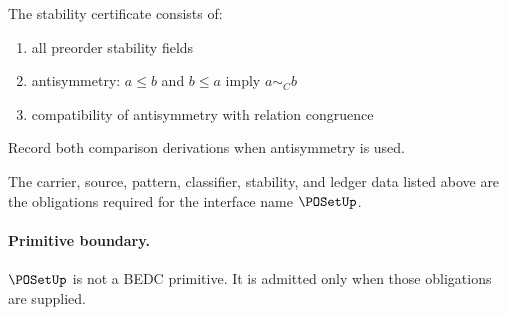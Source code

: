 \begin{definition}
\label{def:poset-stability-certificate}
The stability certificate consists of:
\begin{enumerate}
  \item all preorder stability fields
  \item antisymmetry: \(a\le b\) and \(b\le a\) imply \(a\sim_C b\)
  \item compatibility of antisymmetry with relation congruence
\end{enumerate}
\end{definition}

\begin{definition}
\label{def:poset-ledger-policy}
Record both comparison derivations when antisymmetry is used.
\end{definition}

\begin{definition}
\label{def:poset-certificate-obligations}
The carrier, source, pattern, classifier, stability, and ledger data listed above are the obligations required for the interface name \(\POSetUp\).
\end{definition}

\paragraph{Primitive boundary.}
\(\POSetUp\) is not a BEDC primitive. It is admitted only when those obligations are supplied.

